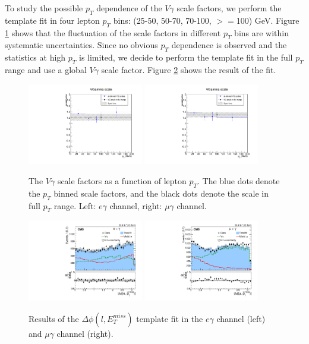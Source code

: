 \documentclass[thesis.tex]{subfiles}
\renewcommand\_{\textunderscore\allowbreak}
\begin{document}
To study the possible $p_T$ dependence of the $V\gamma$ scale factors, we perform the template fit in four lepton $p_T$ bins: (25-50, 50-70, 70-100, $>=$100) GeV. Figure \ref{fig:dphiptdependence} shows that the fluctuation of the scale factors in different $p_T$ bins are within systematic uncertainties. Since no obvious $p_T$ dependence is observed and the statistics at high $p_T$ is limited, we decide to perform the template fit in the full $p_T$ range and use a global $V\gamma$ scale factor. Figure \ref{fig:dphifitresult} shows the result of the fit. 
\begin{figure}[!hbt]
  \centering
    \includegraphics[width=0.45\textwidth]{Figures/scale_ptDependence_eg.pdf}
    \includegraphics[width=0.45\textwidth]{Figures/scale_ptDependence_mg.pdf}
  \caption{The $V\gamma$ scale factors as a function of lepton $p_T$. The blue dots denote the $p_T$ binned scale factors, and the black dots denote the scale in full $p_T$ range. Left: $e\gamma$ channel, right: $\mu\gamma$ channel. }
    \label{fig:dphiptdependence}
\end{figure}

\begin{figure}[!hbt]
  \centering
    \includegraphics[width=0.45\textwidth]{Fig/fit_dPhi_eg.pdf}
    \includegraphics[width=0.45\textwidth]{Fig/fit_dPhi_mg.pdf}
  \caption{Results of the $\Delta\phi(l,E_{T}^{miss})$ template fit in the $e\gamma$ channel (left) and $\mu\gamma$ channel (right).}
    \label{fig:dphifitresult}
\end{figure}
\end{document}
